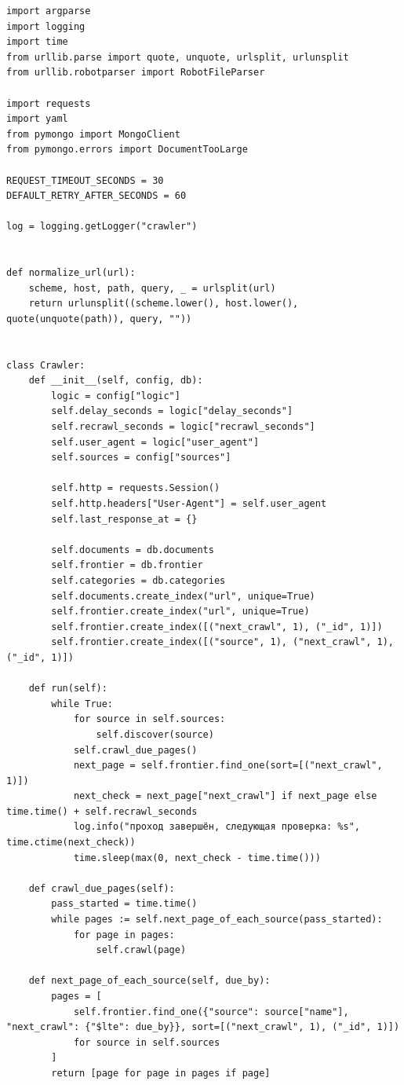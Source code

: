\documentclass[12pt,a4paper,oneside,fleqn]{article}
\begin{document}
\begin{lstlisting}
import argparse
import logging
import time
from urllib.parse import quote, unquote, urlsplit, urlunsplit
from urllib.robotparser import RobotFileParser

import requests
import yaml
from pymongo import MongoClient
from pymongo.errors import DocumentTooLarge

REQUEST_TIMEOUT_SECONDS = 30
DEFAULT_RETRY_AFTER_SECONDS = 60

log = logging.getLogger("crawler")


def normalize_url(url):
    scheme, host, path, query, _ = urlsplit(url)
    return urlunsplit((scheme.lower(), host.lower(), quote(unquote(path)), query, ""))


class Crawler:
    def __init__(self, config, db):
        logic = config["logic"]
        self.delay_seconds = logic["delay_seconds"]
        self.recrawl_seconds = logic["recrawl_seconds"]
        self.user_agent = logic["user_agent"]
        self.sources = config["sources"]

        self.http = requests.Session()
        self.http.headers["User-Agent"] = self.user_agent
        self.last_response_at = {}

        self.documents = db.documents
        self.frontier = db.frontier
        self.categories = db.categories
        self.documents.create_index("url", unique=True)
        self.frontier.create_index("url", unique=True)
        self.frontier.create_index([("next_crawl", 1), ("_id", 1)])
        self.frontier.create_index([("source", 1), ("next_crawl", 1), ("_id", 1)])

    def run(self):
        while True:
            for source in self.sources:
                self.discover(source)
            self.crawl_due_pages()
            next_page = self.frontier.find_one(sort=[("next_crawl", 1)])
            next_check = next_page["next_crawl"] if next_page else time.time() + self.recrawl_seconds
            log.info("проход завершён, следующая проверка: %s", time.ctime(next_check))
            time.sleep(max(0, next_check - time.time()))

    def crawl_due_pages(self):
        pass_started = time.time()
        while pages := self.next_page_of_each_source(pass_started):
            for page in pages:
                self.crawl(page)

    def next_page_of_each_source(self, due_by):
        pages = [
            self.frontier.find_one({"source": source["name"], "next_crawl": {"$lte": due_by}}, sort=[("next_crawl", 1), ("_id", 1)])
            for source in self.sources
        ]
        return [page for page in pages if page]


\end{lstlisting}
\end{document}
